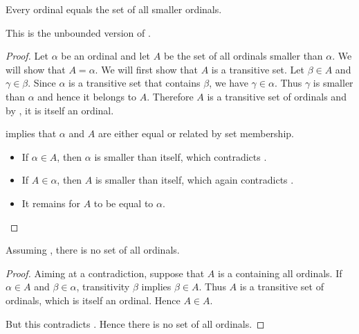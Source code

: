 \begin{proposition}\label{thm:ordinal_is_set_of_smaller_ordinals}
  Every ordinal equals the set of all smaller ordinals.

  This is the unbounded version of .
\end{proposition}
\begin{proof}
  Let \( \alpha \) be an ordinal and let \( A \) be the set of all ordinals smaller than \( \alpha \). We will show that \( A = \alpha \). We will first show that \( A \) is a transitive set. Let \( \beta \in A \) and \( \gamma \in \beta \). Since \( \alpha \) is a transitive set that contains \( \beta \), we have \( \gamma \in \alpha \). Thus \( \gamma \) is smaller than \( \alpha \) and hence it belongs to \( A \). Therefore \( A \) is a transitive set of ordinals and by , it is itself an ordinal.

   implies that \( \alpha \) and \( A \) are either equal or related by set membership.
  \begin{itemize}
    \item If \( \alpha \in A \), then \( \alpha \) is smaller than itself, which contradicts .

    \item If \( A \in \alpha \), then \( A \) is smaller than itself, which again contradicts .

    \item It remains for \( A \) to be equal to \( \alpha \).
  \end{itemize}
\end{proof}

\begin{theorem}\label{thm:burali_forti_paradox}
  Assuming , there is no set of all ordinals.
\end{theorem}
\begin{proof}
  Aiming at a contradiction, suppose that \( A \) is a containing all ordinals. If \( \alpha \in A \) and \( \beta \in \alpha \), transitivity \( \beta \) implies \( \beta \in A \). Thus \( A \) is a transitive set of ordinals, which  is itself an ordinal. Hence \( A \in A \).

  But this contradicts . Hence there is no set of all ordinals.
\end{proof}

